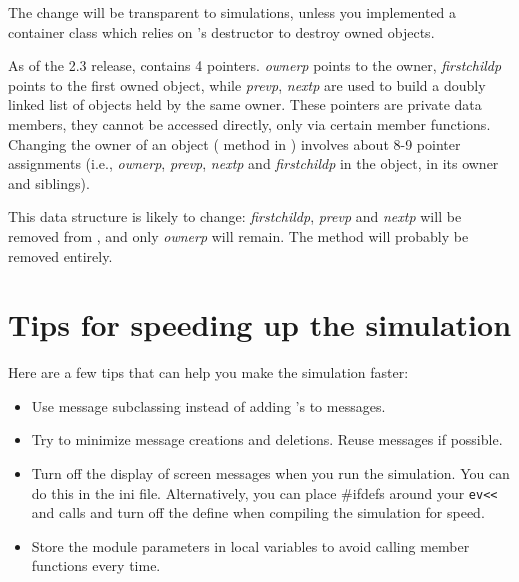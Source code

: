 The change will be transparent to simulations, unless you implemented
a container class which relies on 's destructor
to destroy owned objects.


As of the 2.3 release,  contains 4 pointers.
\textit{ownerp} points to the owner, \textit{firstchildp}
points to the first owned object,
while \textit{prevp}, \textit{nextp} are used to build a doubly linked list
of objects held by the same owner. These pointers are private data
members, they cannot be accessed directly, only via certain
member functions. Changing the owner of an object
( method in )
involves about 8-9 pointer assignments (i.e., \textit{ownerp},
\textit{prevp}, \textit{nextp} and \textit{firstchildp} in the object,
in its owner and siblings).

This data structure is likely to change: \textit{firstchildp},
\textit{prevp} and \textit{nextp} will be removed from ,
and only \textit{ownerp} will remain. The  method
will probably be removed entirely.

\section{Tips for speeding up the simulation}

Here are a few tips that can help you make the simulation faster:
\begin{itemize}
  \item{Use message subclassing instead of adding 's to messages.}
  \item{Try to minimize message creations and deletions. Reuse
    messages if possible.}
  \item{Turn off the display of screen messages when you run the
    simulation.  You can do this in the ini file. Alternatively, you
    can place \#ifdefs around your \texttt{ev<<} and
     calls and turn off the define when compiling
    the simulation for speed.}
  \item{Store the module parameters in local variables to avoid
    calling  member functions every time.}
\end{itemize}



